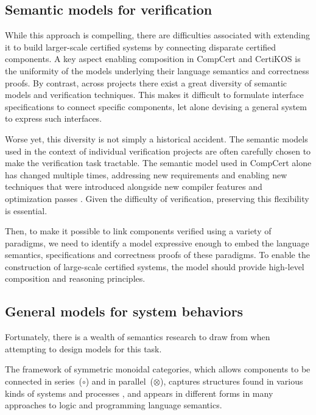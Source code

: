 \documentclass[sigplan,screen]{acmart}
\begin{document}

\subsection{Semantic models for verification} %

While this approach is compelling,
there are difficulties associated with extending it
to build larger-scale certified systems
by connecting disparate certified components.
A key aspect enabling composition in CompCert and CertiKOS
is the uniformity of the models underlying
their language semantics and correctness proofs.
By contrast,
across projects
there exist a great diversity
of semantic models and verification techniques.
This makes it difficult to formulate
interface specifications to connect specific components,
let alone devising a general system
to express such interfaces.

Worse yet,
this diversity is not simply a historical accident.
The semantic models
used in the context of individual verification projects
are often carefully chosen
to make the verification task tractable.
The semantic model used in CompCert alone
has changed multiple times,
addressing new requirements and enabling new techniques
that were introduced alongside
new compiler features and optimization passes \cite{compsem}.
Given the difficulty of verification,
preserving this flexibility is essential.

Then,
to make it possible to link components
verified using a variety of paradigms,
we need to identify a model
expressive enough to embed
the language semantics, specifications and correctness proofs
of these paradigms.
To enable the construction of large-scale certified systems,
the model should provide
high-level composition and reasoning principles.


\subsection{General models for system behaviors} %

Fortunately,
there is a wealth of semantics research to draw from
when attempting to design models for this task.

The framework of
symmetric monoidal categories,
which allows components to be
connected in series~($\circ$) and in parallel~($\otimes$),
captures structures found
in various kinds of systems and processes \cite{rosetta},
and appears in different forms
in many approaches to logic and programming language semantics.
\end{document}
